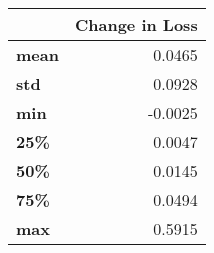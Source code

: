 \begin{tabular}{lr}
\toprule
{} &  Change in Loss \\
\midrule
\textbf{mean} &          0.0465 \\
\textbf{std } &          0.0928 \\
\textbf{min } &         -0.0025 \\
\textbf{25\% } &          0.0047 \\
\textbf{50\% } &          0.0145 \\
\textbf{75\% } &          0.0494 \\
\textbf{max } &          0.5915 \\
\bottomrule
\end{tabular}
